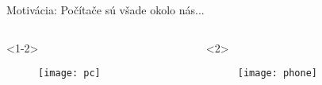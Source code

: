 
\begin{frame}[t]{Motivácia: Počítače sú všade okolo nás...}
\begin{columns}
\begin{column}{.48\textwidth}
\begin{onlyenv}<1-2>
\begin{figure}
\centering
  \texttt{[image: pc]}\\
\end{figure}
\end{onlyenv}
\end{column}
\begin{column}{.48\textwidth}
\begin{onlyenv}<2>
\begin{figure}
\centering
  \texttt{[image: phone]}\\
\end{figure}
\end{onlyenv}
\end{column}
\end{columns}
\end{frame}
